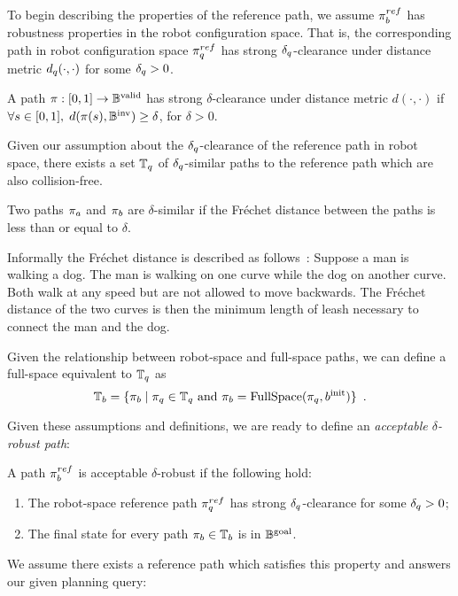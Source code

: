 To begin describing the properties of the reference path, we assume $\pi_{b}^{ref}$ has robustness properties in the robot configuration space.  That is, the corresponding path in robot configuration space $\pi_{q}^{ref}$ has strong $\delta_q$-clearance under distance metric $d_q(\cdot,\cdot)$ for some $\delta_q > 0$.

\begin{definition}
    A path $\pi : [0, 1] \rightarrow \mathbb{B}^\textrm{valid}$ has strong $\delta$-clearance under distance metric $d(\cdot,\cdot)$ if $\forall s \in [0, 1],\; d(\pi(s), \mathbb{B}^\textrm{inv}) \geq \delta$, for $\delta > 0$.
\end{definition}

Given our assumption about the $\delta_q$-clearance of the reference path in robot space, there exists a set $\mathbb{T}_q$ of $\delta_q$-similar paths to the reference path which are also collision-free.

\begin{definition}
    Two paths $\pi_a$ and $\pi_b$ are $\delta$-similar if the Fr\'echet distance between the paths is less than or equal to $\delta$.
\end{definition}

Informally the Fr\'echet distance is described as follows~\cite{Alt1995Frechet}: Suppose a man is walking a dog. The man is walking on one curve while the dog on another curve. Both walk at any speed but are not allowed to move backwards. The Fr\'echet distance of the two curves is then the minimum length of leash necessary to connect the man and the dog.


Given the relationship between robot-space and full-space paths, we can define a full-space equivalent to $\mathbb{T}_q$ as
\begin{equation}
    \mathbb{T}_b = \{ \pi_{b} \mid \pi_{q} \in \mathbb{T}_q \textrm{ and } \pi_{b} = \textrm{FullSpace}(\pi_{q}, b^\textrm{init}) \} \enspace .
\end{equation}

Given these assumptions and definitions, we are ready to define an \textit{acceptable $\delta$-robust path}:
\begin{definition}
\label{def:robust}
A path $\pi_{b}^{ref}$ is acceptable $\delta$-robust if the following hold:
\begin{enumerate}
    \item The robot-space reference path $\pi_{q}^{ref}$ has strong $\delta_q$-clearance for some $\delta_q > 0$;
    \item The final state for every path $\pi_{b} \in \mathbb{T}_b$ is in $\mathbb{B}^\textrm{goal}$. 
\end{enumerate}
\end{definition}
\noindent We assume there exists a reference path which satisfies this property and answers our given planning query:

